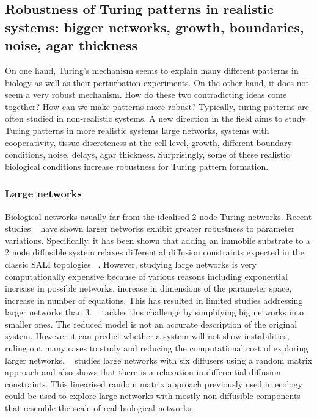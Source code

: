 \subsection{Robustness of Turing patterns in realistic systems: bigger networks, growth, boundaries, noise, agar thickness}
On one hand, Turing's mechanism seems to explain many different patterns in biology as well as their perturbation experiments.
On the other hand, it does not seem a very robust mechanism.
How do these two contradicting ideas come together?
How can we make patterns more robust?
Typically, turing patterns are often studied in non-realistic systems.
A new direction in the field aims to study Turing patterns in more realistic systems large networks, systems with cooperativity, tissue discreteness at the cell level, growth, different boundary conditions, noise, delays, agar thickness.
Surprisingly, some of these realistic biological conditions increase robustness for Turing pattern formation. %

\subsubsection{Large networks}
Biological networks usually far from the idealised 2-node Turing networks. %
Recent studies ~\parencite{Zheng2016, Scholes2019, Marcon} have shown larger networks exhibit greater robustness to parameter variations.
Specifically, it has been shown that adding an immobile substrate to a 2 node diffusible system relaxes differential diffusion constraints expected in the classic SALI topologies ~\parencite{korvasova2015}.
However, studying large networks is very computationally expensive because of various reasons including exponential increase in possible networks, increase in dimensions of the parameter space, increase in number of equations.
This has resulted in limited studies addressing larger networks than 3.
~\cite{Smith2018a} tackles this challenge by simplifying big networks into smaller ones.
The reduced model is not an accurate description of the original system.
However it can predict whether a system will not show instabilities, ruling out many cases to study and reducing the computational cost of exploring larger networks.
~\cite{Haas2021} studies large networks with six diffusers using a random matrix approach and also shows that there is a relaxation in differential diffusion constraints.
This linearised random matrix approach previously used in ecology ~\parencite{May1972} could be used to explore large networks with mostly non-diffusible components that resemble the scale of real biological networks. %

